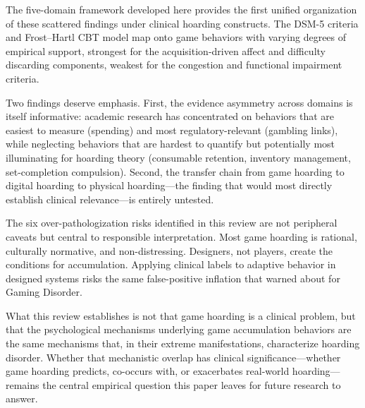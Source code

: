 \documentclass[12pt]{article}
\begin{document}
The five-domain framework developed here provides the first unified organization of these scattered findings under clinical hoarding constructs. The DSM-5 criteria and Frost--Hartl CBT model map onto game behaviors with varying degrees of empirical support, strongest for the acquisition-driven affect and difficulty discarding components, weakest for the congestion and functional impairment criteria.

Two findings deserve emphasis. First, the evidence asymmetry across domains is itself informative: academic research has concentrated on behaviors that are easiest to measure (spending) and most regulatory-relevant (gambling links), while neglecting behaviors that are hardest to quantify but potentially most illuminating for hoarding theory (consumable retention, inventory management, set-completion compulsion). Second, the transfer chain from game hoarding to digital hoarding to physical hoarding---the finding that would most directly establish clinical relevance---is entirely untested.

The six over-pathologization risks identified in this review are not peripheral caveats but central to responsible interpretation. Most game hoarding is rational, culturally normative, and non-distressing. Designers, not players, create the conditions for accumulation. Applying clinical labels to adaptive behavior in designed systems risks the same false-positive inflation that \citet{Aarseth2017} warned about for Gaming Disorder.

What this review establishes is not that game hoarding is a clinical problem, but that the psychological mechanisms underlying game accumulation behaviors are the same mechanisms that, in their extreme manifestations, characterize hoarding disorder. Whether that mechanistic overlap has clinical significance---whether game hoarding predicts, co-occurs with, or exacerbates real-world hoarding---remains the central empirical question this paper leaves for future research to answer.
\end{document}
